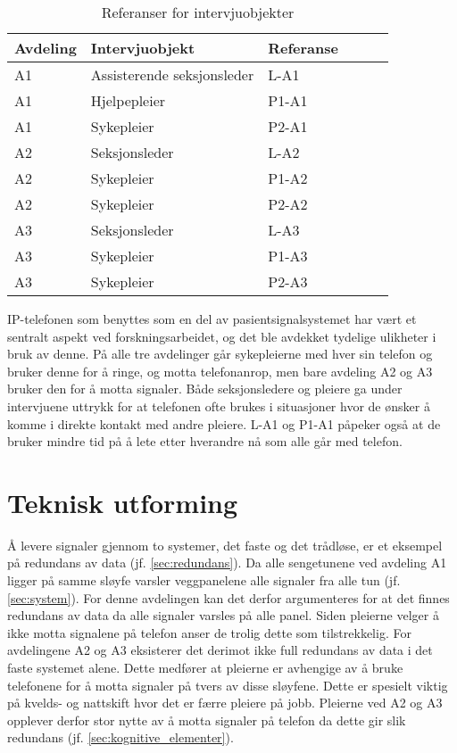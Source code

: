 \begin{table}[H]\centering
    \begin{tabular}{ |l|l|l|l|l|l| }
    \hline
    \textbf{Avdeling} & \textbf{Intervjuobjekt} & \textbf{Referanse} \\ \hline
       A1 & Assisterende seksjonsleder & L-A1 \\ \hline
       A1 & Hjelpepleier & P1-A1 \\ \hline
       A1 & Sykepleier & P2-A1 \\ \hline
       A2 & Seksjonsleder & L-A2 \\ \hline
       A2 & Sykepleier & P1-A2 \\ \hline
       A2 & Sykepleier & P2-A2 \\ \hline
       A3 & Seksjonsleder & L-A3 \\ \hline
       A3 & Sykepleier & P1-A3 \\ \hline
       A3 & Sykepleier & P2-A3 \\ \hline
    \end{tabular}
    \caption {Referanser for intervjuobjekter}
    \label{referanserintervju}
\end{table}

\noindent
IP-telefonen som benyttes som en del av pasientsignalsystemet har vært et sentralt aspekt ved forskningsarbeidet, og det ble avdekket tydelige ulikheter i bruk av denne. På alle tre avdelinger går sykepleierne med hver sin telefon og bruker denne for å ringe, og motta telefonanrop, men bare avdeling A2 og A3 bruker den for å motta signaler. Både seksjonsledere og pleiere ga under intervjuene uttrykk for at telefonen ofte brukes i situasjoner hvor de ønsker å komme i direkte kontakt med andre pleiere. L-A1 og P1-A1 påpeker også at de bruker mindre tid på å lete etter hverandre nå som alle går med telefon.  

\section{Teknisk utforming}
Å levere signaler gjennom to systemer, det faste og det trådløse, er et eksempel på redundans av data (jf. \ref{sec:redundans}). Da alle sengetunene ved avdeling A1 ligger på samme sløyfe varsler veggpanelene alle signaler fra alle tun (jf. \ref{sec:system}). For denne avdelingen kan det derfor argumenteres for at det finnes redundans av data da alle signaler varsles på alle panel. Siden pleierne velger å ikke motta signalene på telefon anser de trolig dette som tilstrekkelig. For avdelingene A2 og A3 eksisterer det derimot ikke full redundans av data i det faste systemet alene. Dette medfører at pleierne er avhengige av å bruke telefonene for å motta signaler på tvers av disse sløyfene. Dette er spesielt viktig på kvelds- og nattskift hvor det er færre pleiere på jobb. Pleierne ved A2 og A3 opplever derfor stor nytte av å motta signaler på telefon da dette gir slik redundans (jf. \ref{sec:kognitive_elementer}).

